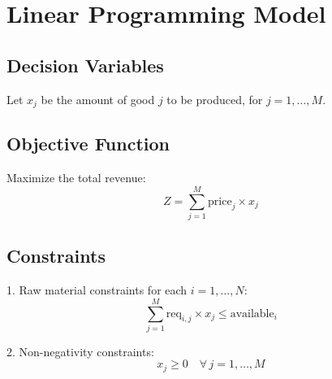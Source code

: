 \documentclass{article}
\begin{document}
\section*{Linear Programming Model}

\subsection*{Decision Variables}
Let \( x_j \) be the amount of good \( j \) to be produced, for \( j = 1, \ldots, M \).

\subsection*{Objective Function}
Maximize the total revenue:
\[
Z = \sum_{j=1}^{M} \text{price}_j \times x_j
\]

\subsection*{Constraints}

1. Raw material constraints for each \( i = 1, \ldots, N \):
   \[
   \sum_{j=1}^{M} \text{req}_{i,j} \times x_j \leq \text{available}_i
   \]

2. Non-negativity constraints:
   \[
   x_j \geq 0 \quad \forall \, j = 1, \ldots, M
   \]
\end{document}
